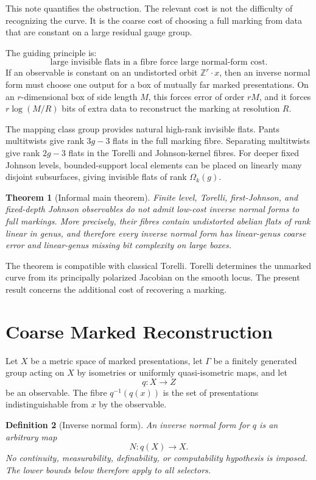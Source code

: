 \documentclass[11pt]{article}
\newtheorem{theorem}{Theorem}[section]
\newtheorem{definition}[theorem]{Definition}
\begin{document}
This note quantifies the obstruction.  The relevant cost is not the difficulty
of recognizing the curve.  It is the coarse cost of choosing a full marking from
data that are constant on a large residual gauge group.

The guiding principle is:
\[
\text{large invisible flats in a fibre force large normal-form cost.}
\]
If an observable is constant on an undistorted orbit
\(\mathbb Z^r\cdot x\), then an inverse normal form must choose one output for a
box of mutually far marked presentations.  On an \(r\)-dimensional box of side
length \(M\), this forces error of order \(rM\), and it forces
\(r\log(M/R)\) bits of extra data to reconstruct the marking at resolution
\(R\).

The mapping class group provides natural high-rank invisible flats.  Pants
multitwists give rank \(3g-3\) flats in the full marking fibre.  Separating
multitwists give rank \(2g-3\) flats in the Torelli and Johnson-kernel fibres.
For deeper fixed Johnson levels, bounded-support local elements can be placed on
linearly many disjoint subsurfaces, giving invisible flats of rank \(\Omega_k(g)\).

\begin{theorem}[Informal main theorem]
Finite level, Torelli, first-Johnson, and fixed-depth Johnson observables do not
admit low-cost inverse normal forms to full markings.  More precisely, their
fibres contain undistorted abelian flats of rank linear in genus, and therefore
every inverse normal form has linear-genus coarse error and linear-genus missing
bit complexity on large boxes.
\end{theorem}

The theorem is compatible with classical Torelli.  Torelli determines the
unmarked curve from its principally polarized Jacobian on the smooth locus.  The
present result concerns the additional cost of recovering a marking.

\section{Coarse Marked Reconstruction}

Let \(X\) be a metric space of marked presentations, let \(\Gamma\) be a
finitely generated group acting on \(X\) by isometries or uniformly
quasi-isometric maps, and let
\[
q:X\to Z
\]
be an observable.  The fibre \(q^{-1}(q(x))\) is the set of presentations
indistinguishable from \(x\) by the observable.

\begin{definition}[Inverse normal form]
An inverse normal form for \(q\) is an arbitrary map
\[
N:q(X)\to X.
\]
No continuity, measurability, definability, or computability hypothesis is
imposed.  The lower bounds below therefore apply to all selectors.
\end{definition}
\end{document}

